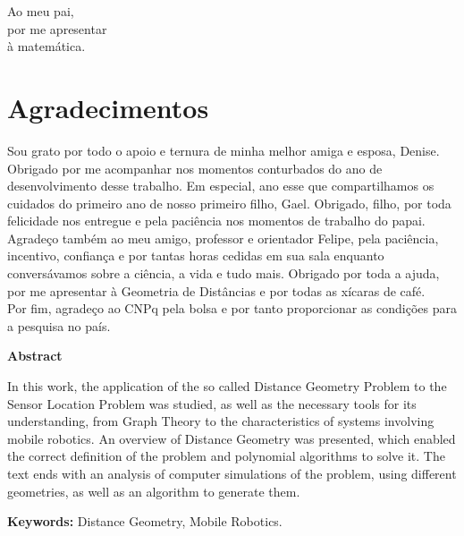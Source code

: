 \documentclass[a4paper,12pt]{report}
\begin{document}
	\newpage
	\vspace*{\fill}
	\begin{flushright}
		Ao meu pai, \\por me apresentar \\à matemática.
	\end{flushright}
	
	\newpage
	
	\chapter*{Agradecimentos}
	
	Sou grato por todo o apoio e ternura de minha melhor amiga e esposa, Denise. Obrigado por me acompanhar nos momentos conturbados do ano de desenvolvimento desse trabalho. Em especial, ano esse que compartilhamos os cuidados do primeiro ano de nosso primeiro filho, Gael. Obrigado, filho, por toda felicidade nos entregue e pela paciência nos momentos de trabalho do papai. 
	\\
	
	Agradeço também ao meu amigo, professor e orientador Felipe, pela paciência, incentivo, confiança e por tantas horas cedidas em sua sala enquanto conversávamos sobre a ciência, a vida e tudo mais. Obrigado por toda a ajuda, por me apresentar à Geometria de Distâncias e por todas as xícaras de café.
	\\
	
	Por fim, agradeço ao CNPq pela bolsa e por tanto proporcionar as condições para a pesquisa no país.
	
	\newpage
	\tableofcontents
	\newpage
	
	\begin{center}
		\large
		\textbf{Abstract}
	\end{center}
	
	
	In this work, the application of the so called Distance Geometry Problem to the Sensor Location Problem was studied, as well as the necessary tools for its understanding, from Graph Theory to the characteristics of systems involving mobile robotics. An overview of Distance Geometry was presented, which enabled the correct definition of the problem and polynomial algorithms to solve it. The text ends with an analysis of computer simulations of the problem, using different geometries, as well as an algorithm to generate them.
	
	\textbf{Keywords:} Distance Geometry, Mobile Robotics.
	
\end{document}
